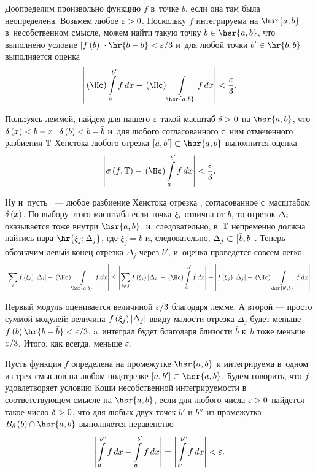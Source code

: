 \documentclass[draft]{article}
\begin{document}
\pr

Доопределим произвольно функцию $f$ в~точке $b$, если она там была
неопределена. Возьмем любое $\varepsilon > 0$. Поскольку $f$ интегрируема на
$\hsr{a, b}$ в~несобственном смысле, можем найти такую точку
$\bar{b}\in\hsr{a, b}$, что выполнено условие
$\abs{f\at(b)}\cdot\hr{b-\bar{b}}<\ep/3$ и~для любой точки
$b'\in\hr{\bar{b}, b}$ выполняется оценка
$$\abs{\kurzh\intd[a,b']f,x-\kurzh \int\limits_{\hsr{a,b}}   f\,dx}<{\ep\over3}.$$

Пользуясь леммой, найдем для нашего $\varepsilon$ такой масштаб $\delta > 0$ на
$\hsr{a, b}$, что $\dex<b-x$, $\de\at(b)<b-\bar{b}$ и~для любого
согласованного с~ним отмеченного разбиения $\mathbb{T}$ Хенстока любого
отрезка $\seg[a,b']\subset\hsr{a, b}$ выполнится оценка
$$\abs{\isfT-\kurzh\intd[a,b']f,x}<{\ep\over3}.$$

\eject

Ну и~пусть \Tdixif\ --- любое разбиение Хенстока отрезка \ab,
согласованное с~масштабом $\dex$. По выбору этого масштаба если
точка $\xi_i$ отлична от $b$, то отрезок $\Delta_i$ оказывается тоже
внутри $\hsr{a, b}$, и, следовательно, в~$\mathbb{T}$ непременно должна
найтись пара $\hr{\xi_j;\Delta_j}$, где $\xi_j=b$ и, следовательно,
$\Delta_j\subset\seg[\bar{b},b]$. Теперь обозначим левый конец
отрезка $\Delta_j$ через $b'$, и~оценка проведется совсем легко:
$$\abs{\sumi\fxildi-\kurzh \int\limits_{\hsr{a,b}}   f\,dx}\le
\abs{\sum_{i\neq j}\fxildi-\kurzh\intd[a,b']f,x}+
\abs{f\at(\xi_j)\abs{\Delta_j}-\kurzh  \int\limits_{\hsr{b' ,b}}   f\,dx}.$$

Первый модуль оценивается величиной $\varepsilon/3$ благодаря лемме. А
второй --- просто суммой модулей: величина
$f\at(\xi_j)\abs{\Delta_j}$ ввиду малости отрезка $\Delta_j$ будет
меньше $f\at(b)\hr{b-\bar{b}}<\ep/3$, a~интеграл будет благодаря
близости $\bar{b}$ к~$b$ тоже меньше $\varepsilon/3$. Итого, как всегда,
меньше $\varepsilon$.

\prtm

\bigskip

\df Пусть функция $f$ определена на промежутке $\hsr{a, b}$ и
интегрируема в~одном из трех смыслов на любом подотрезке
$\seg[a,b']\subset\hsr{a, b}$. Будем говорить, что $f$
удовлетворяет условию Коши несобственной интегрируемости в
соответствующем смысле на $\hsr{a, b}$, если для любого числа
$\varepsilon > 0$ найдется такое число $\delta > 0$, что для любых двух точек $b'$
и $b''$ из промежутка $B_{\de}\at(b)\cap\hsr{a, b}$ выполняется
неравенство
$$\abs{\intd[a,b'']f,x-\intd[a,b']f,x}=\abs{\,\intd[b',b'']f,x}<\ep.$$

\bigskip
\end{document}
